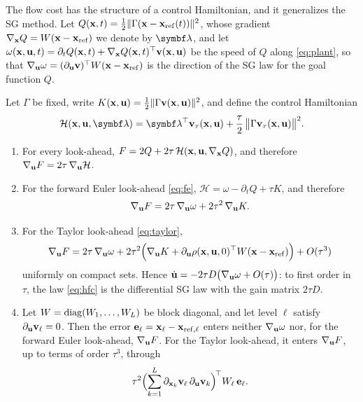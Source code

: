 
The flow cost has the structure of a control Hamiltonian, and it generalizes the SG method.
Let $Q(\mathbf{x},t) = \frac12\lVert\Gamma(\mathbf{x} - \mathbf{x}_{\mathrm{ref}}(t))\rVert^2$, whose gradient
$\nabla_{\mathbf{x}}Q = W(\mathbf{x} - \mathbf{x}_{\mathrm{ref}})$ we denote by $\blambda$, and let
$\omega(\mathbf{x},\mathbf{u},t) = \partial_t Q(\mathbf{x},t) + \nabla_{\mathbf{x}}Q(\mathbf{x},t)^\top\mathbf{v}(\mathbf{x},\mathbf{u})$ be the speed of $Q$
along \eqref{eq:plant}, so that $\nabla_{\mathbf{u}}\omega = (\partial_{\mathbf{u}}\mathbf{v})^\top W(\mathbf{x} - \mathbf{x}_{\mathrm{ref}})$ is the
direction of the SG law for the goal function $Q$.

\begin{proposition}\label{prop:sg}
Let $\Gamma$ be fixed, write $K(\mathbf{x},\mathbf{u}) = \frac12\lVert\Gamma\mathbf{v}(\mathbf{x},\mathbf{u})\rVert^2$, and define the control
Hamiltonian
\begin{equation}\label{eq:hamiltonian}
    \mathcal{H}(\bx,\bu,\blambda) = \blambda^\T\bv_\tau(\bx,\bu)
    + \frac{\tau}{2}\,\norm[\big]{\Gamma\bv_\tau(\bx,\bu)}^2 .
\end{equation}
\begin{enumerate}
    \item For every look-ahead, $F = 2Q + 2\tau\,\mathcal{H}(\mathbf{x},\mathbf{u},\nabla_{\mathbf{x}}Q)$, and therefore
    $\nabla_{\mathbf{u}}F = 2\tau\,\nabla_{\mathbf{u}}\mathcal{H}$.
    \item For the forward Euler look-ahead \eqref{eq:fe}, $\mathcal{H} = \omega - \partial_t Q + \tau K$,
    and therefore
    \begin{equation}\label{eq:sg-fe}
        \nabla_{\mathbf{u}}F = 2\tau\,\nabla_{\mathbf{u}}\omega + 2\tau^2\,\nabla_{\mathbf{u}}K.
    \end{equation}
    \item For the Taylor look-ahead \eqref{eq:taylor},
    \begin{equation}\label{eq:sg-taylor}
        \nabla_{\mathbf{u}}F = 2\tau\,\nabla_{\mathbf{u}}\omega
        + 2\tau^2\Bigl(\nabla_{\mathbf{u}}K + \partial_{\mathbf{u}}\rho(\mathbf{x},\mathbf{u},0)^\top W(\mathbf{x} - \mathbf{x}_{\mathrm{ref}})\Bigr)
        + O(\tau^3)
    \end{equation}
    uniformly on compact sets.
    Hence $\dot{\mathbf{u}} = -2\tau D\bigl(\nabla_{\mathbf{u}}\omega + O(\tau)\bigr)$: to first order in $\tau$,
    the \method{} law \eqref{eq:hfc} is the differential SG law with the gain matrix $2\tau D$.
    \item Let $W = \operatorname{diag}(W_1,\dots,W_L)$ be block diagonal, and let level $\ell$ satisfy
    $\partial_{\mathbf{u}}\mathbf{v}_\ell = 0$. Then the error $\mathbf{e}_\ell = \mathbf{x}_\ell - \mathbf{x}_{\mathrm{ref},\ell}$
    enters neither $\nabla_{\mathbf{u}}\omega$ nor, for the forward Euler look-ahead, $\nabla_{\mathbf{u}}F$.
    For the Taylor look-ahead, it enters $\nabla_{\mathbf{u}}F$, up to terms of order $\tau^3$, through
    \begin{equation}\label{eq:sg-lower}
        \tau^2\Bigl(\sum_{k=1}^{L}\partial_{\mathbf{x}_k}\mathbf{v}_\ell\,\partial_{\mathbf{u}}\mathbf{v}_k\Bigr)^{\!\top}
        W_\ell\,\mathbf{e}_\ell .
    \end{equation}
\end{enumerate}
\end{proposition}

